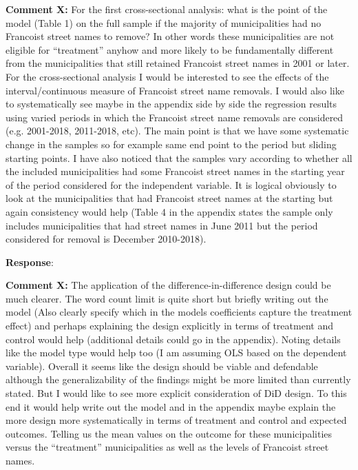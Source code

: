 \documentclass[12pt, a4paper, notitlepage]{article}
\begin{document}
\textbf{Comment X:} For the first cross-sectional analysis: what is the point of the model (Table 1) on the full sample if the majority of municipalities had no Francoist street names to remove? In other words these municipalities are not eligible for “treatment” anyhow and more likely to be fundamentally different from the municipalities that still retained Francoist street names in 2001 or later. For the cross-sectional analysis I would be interested to see the effects of the interval/continuous measure of Francoist street name removals. I would also like to systematically see maybe in the appendix side by side the regression results using varied periods in which the Francoist street name removals are considered (e.g. 2001-2018, 2011-2018, etc). The main point is that we have some systematic change in the samples so for example same end point to the period but sliding starting points. I have also noticed that the samples vary according to whether all the included municipalities had some Francoist street names in the starting year of the period considered for the independent variable. It is logical obviously to look at the municipalities that had Francoist street names at the starting but again consistency would help (Table 4 in the appendix states the sample only includes municipalities that had street names in June 2011 but the period considered for removal is December 2010-2018).

\textbf{Response}: {\color{red}{pending}}

\textbf{Comment X:} The application of the difference-in-difference design could be much clearer. The word count limit is quite short but briefly writing out the model (Also clearly specify which in the models coefficients capture the treatment effect) and perhaps explaining the design explicitly in terms of treatment and control would help (additional details could go in the appendix). Noting details like the model type would help too (I am assuming OLS based on the dependent variable). Overall it seems like the design should be viable and defendable although the generalizability of the findings might be more limited than currently stated. But I would like to see more explicit consideration of DiD design. To this end it would help write out the model and in the appendix maybe explain the more design more systematically in terms of treatment and control and expected outcomes. Telling us the mean values on the outcome for these municipalities versus the “treatment” municipalities as well as the levels of Francoist street names.
\end{document}
